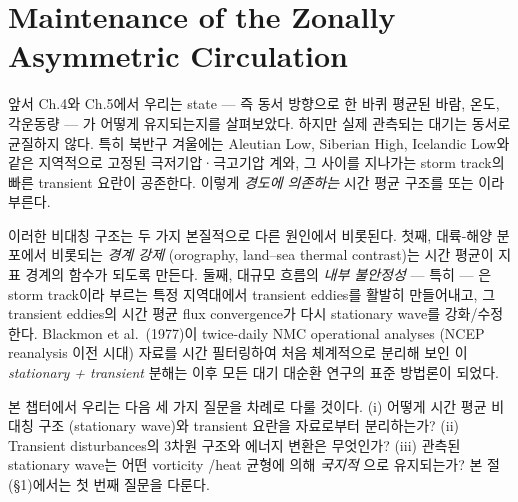 
\section{Maintenance of the Zonally Asymmetric Circulation}

앞서 Ch.4와 Ch.5에서 우리는  state — 즉 동서 방향으로 한
바퀴 평균된 바람, 온도, 각운동량 — 가 어떻게 유지되는지를 살펴보았다.  하지만
실제 관측되는 대기는 동서로 균질하지 않다.  특히 북반구 겨울에는 Aleutian
Low, Siberian High, Icelandic Low와 같은 지역적으로 고정된 극저기압·극고기압
계와, 그 사이를 지나가는 storm track의 빠른 transient 요란이 공존한다.  이렇게
\textit{경도에 의존하는} 시간 평균 구조를  또는
이라 부른다.

이러한 비대칭 구조는 두 가지 본질적으로 다른 원인에서 비롯된다.  첫째,
대륙-해양 분포에서 비롯되는 \textit{경계 강제} (orography, land--sea thermal
contrast)는 시간 평균이 지표 경계의 함수가 되도록 만든다.  둘째,
대규모 흐름의 \textit{내부 불안정성} — 특히  — 은
storm track이라 부르는 특정 지역대에서 transient eddies를 활발히 만들어내고,
그 transient eddies의 시간 평균 flux convergence가 다시 stationary wave를
강화/수정한다.  Blackmon et al.\ (1977)이 twice-daily NMC operational
analyses (NCEP reanalysis 이전 시대) 자료를 시간 필터링하여 처음
체계적으로 분리해 보인 이 \textit{stationary + transient} 분해는 이후 모든
대기 대순환 연구의 표준 방법론이 되었다.

본 챕터에서 우리는 다음 세 가지 질문을 차례로 다룰 것이다.  (i) 어떻게 시간
평균 비대칭 구조 (stationary wave)와 transient 요란을 자료로부터 분리하는가?
(ii) Transient disturbances의 3차원 구조와 에너지 변환은 무엇인가?  (iii)
관측된 stationary wave는 어떤 vorticity \!/heat 균형에 의해 \textit{국지적}
으로 유지되는가?  본 절(§1)에서는 첫 번째 질문을 다룬다.



